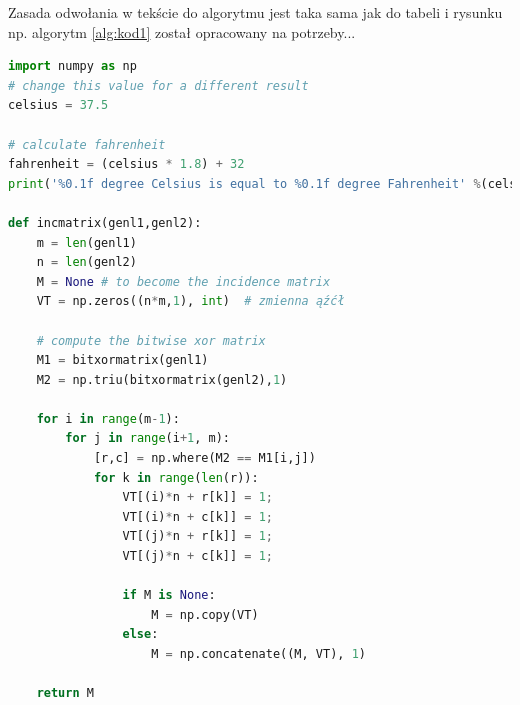 Zasada odwołania w tekście do algorytmu jest taka sama jak do tabeli i rysunku np. algorytm \ref{alg:kod1} został opracowany na potrzeby...

\begin{lstlisting}[language=Python, caption=Fragment algorytmu xxx, label=alg:kod1]
import numpy as np
# change this value for a different result
celsius = 37.5

# calculate fahrenheit
fahrenheit = (celsius * 1.8) + 32
print('%0.1f degree Celsius is equal to %0.1f degree Fahrenheit' %(celsius,fahrenheit))
 
def incmatrix(genl1,genl2):
    m = len(genl1)
    n = len(genl2)
    M = None # to become the incidence matrix
    VT = np.zeros((n*m,1), int)  # zmienna ąźćł
 
    # compute the bitwise xor matrix
    M1 = bitxormatrix(genl1)
    M2 = np.triu(bitxormatrix(genl2),1) 
 
    for i in range(m-1):
        for j in range(i+1, m):
            [r,c] = np.where(M2 == M1[i,j])
            for k in range(len(r)):
                VT[(i)*n + r[k]] = 1;
                VT[(i)*n + c[k]] = 1;
                VT[(j)*n + r[k]] = 1;
                VT[(j)*n + c[k]] = 1;
 
                if M is None:
                    M = np.copy(VT)
                else:
                    M = np.concatenate((M, VT), 1)
 
    return M
\end{lstlisting}
